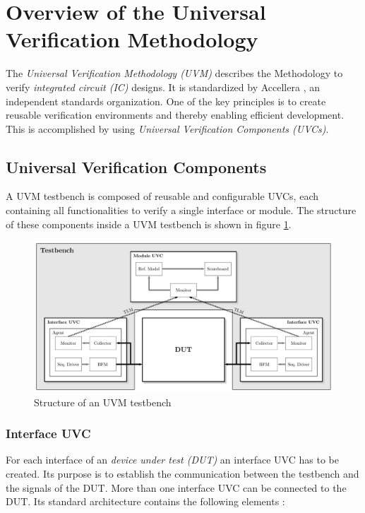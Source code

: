 \section{Overview of the Universal Verification Methodology}\label{uvm}

The \emph{Universal Verification Methodology (UVM)} describes the Methodology to verify \emph{integrated circuit (IC)} designs. 
It is standardized by Accellera \cite{uvm}, an independent standards organization. 
One of the key principles is to create reusable verification environments and thereby enabling efficient development.
This is accomplished by using \emph{Universal Verification Components (UVCs)}.

\subsection{Universal Verification Components}\label{uvc}

A UVM testbench is composed of reusable and configurable UVCs, each containing all functionalities to verify a single interface or module.
The structure of these components inside a UVM testbench is shown in figure \ref{fig:uvm_testbench}.

\begin{figure}[htb]
 \centering
 \includegraphics[width=1.0\textwidth,angle=0]{images/uvm_tb}
 \caption{Structure of an UVM testbench}
\label{fig:uvm_testbench}
\end{figure}

\subsubsection{Interface UVC}\label{interface_uvc}

For each interface of an \emph{device under test (DUT)} an interface UVC has to be created. 
Its purpose is to establish the communication between the testbench and the signals of the DUT.
More than one interface UVC can be connected to the DUT. 
Its standard architecture contains the following elements \cite{uvm_sv}:

